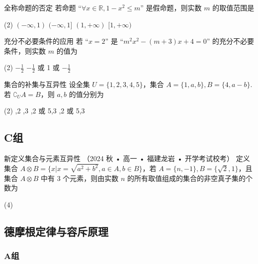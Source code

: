 \begin{choice}{}{全称命题的否定}
	若命题 “$\forall x \in \mathbb{R}, 1-x^2 \le m$” 是假命题，则实数 $m$ 的取值范围是
	\begin{tasks}(2)
		\task $(-\infty, 1)$
		\task $(-\infty, 1]$
		\task $(1, +\infty)$
		\task $[1, +\infty)$
	\end{tasks}
\end{choice}

\begin{choice}{}{充分不必要条件的应用}
	若 “$x=2$” 是 “$m^2x^2 - (m+3)x + 4 = 0$” 的充分不必要条件，则实数 $m$ 的值为
	\begin{tasks}(2)
		\task $-\frac{1}{2}$
		\task $-\frac{1}{2}$ 或 1
		 或 $-\frac{1}{2}$
	\end{tasks}
\end{choice}

\begin{choice}{}{集合的补集与互异性}
	设全集 $U=\{1,2,3,4,5\}$，集合 $A=\{1,a,b\}, B=\{4, a-b\}$.若 $\complement_U A = B$，则 $a,b$ 的值分别为
	\begin{tasks}(2)
		,2
		,3
		,2 或 5,3
		,2 或 5,3
	\end{tasks}
\end{choice}


\subsection*{C组}

\begin{choice}{}{新定义集合与元素互异性}
	{（2024 秋 • 高一 • 福建龙岩 • 开学考试校考）} 定义集合 $A \otimes B = \{x | x=\sqrt{a^2+b^2}, a \in A, b \in B\}$，若 $A=\{n, -1\}, B=\{\sqrt{2}, 1\}$，且集合 $A \otimes B$ 中有 3 个元素，则由实数 $n$ 的所有取值组成的集合的非空真子集的个数为
	\begin{tasks}(4)
	\end{tasks}
\end{choice}

\subsection*{德摩根定律与容斥原理}

\subsubsection*{A组}

